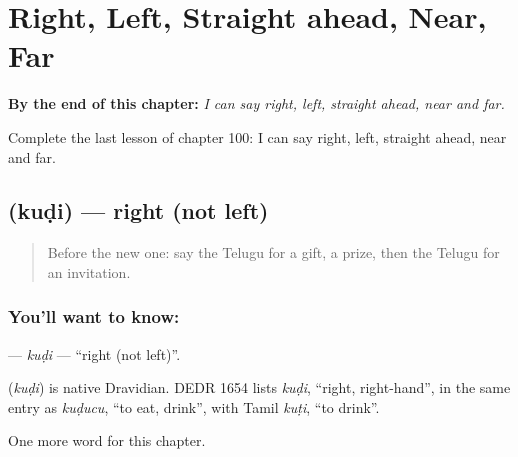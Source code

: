 
\chapter{Right, Left, Straight ahead, Near, Far}
\label{ch:te-right-left-straight-ahead-near-far}

\begin{chapteropening}
\textbf{By the end of this chapter:} \emph{I can say right, left, straight ahead, near and far.}

Complete the last lesson of chapter 100: I can say right, left, straight ahead, near and far.
\end{chapteropening}

\section[\texorpdfstring{\te{కుడి} (kuḍi)}{కుడి (kuḍi)}]{ (kuḍi) — right (not left)}

\label{lesson:TE-C100-kudi}



\begin{quote}
Before the new one: say the Telugu for a gift, a prize, then the Telugu for an invitation.
\end{quote}

\subsection*{You'll want to know: }
\textbf{} — \emph{kuḍi} — \textquotedblleft{}right (not left)\textquotedblright{}.

\begin{cousinweb}
\textbf{} (\emph{kuḍi}) is native Dravidian. DEDR 1654 lists \emph{kuḍi}, \textquotedblleft{}right, right-hand\textquotedblright{}, in the same entry as \emph{kuḍucu}, \textquotedblleft{}to eat, drink\textquotedblright{}, with Tamil \emph{kuṭi}, \textquotedblleft{}to drink\textquotedblright{}.
\end{cousinweb}

\begin{grammarlens}[title={What you've built}]
One more word for this chapter.
\end{grammarlens}


